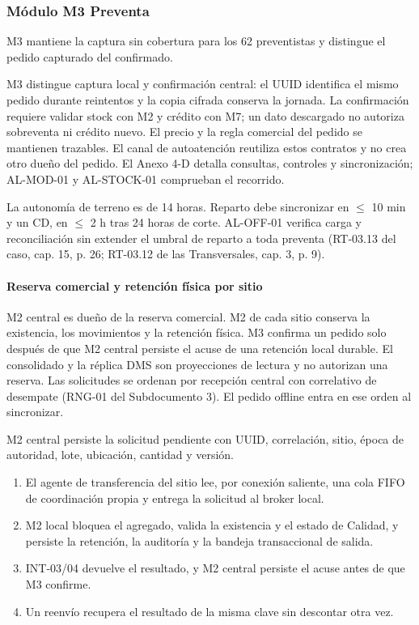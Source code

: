\subsubsection{Módulo M3 Preventa}
\label{subsec:modulo-m3}

M3 mantiene la captura sin cobertura para los 62 preventistas y distingue el pedido capturado del confirmado.

M3 distingue captura local y confirmación central: el UUID identifica el mismo pedido durante reintentos y la copia cifrada conserva la jornada. La confirmación requiere validar stock con M2 y crédito con M7; un dato descargado no autoriza sobreventa ni crédito nuevo. El precio y la regla comercial del pedido se mantienen trazables. El canal de autoatención reutiliza estos contratos y no crea otro dueño del pedido. El Anexo 4-D detalla consultas, controles y sincronización; AL-MOD-01 y AL-STOCK-01 comprueban el recorrido.

La autonomía de terreno es de 14 horas. Reparto debe sincronizar en $\leq$ 10 min y un CD, en $\leq$ 2 h tras 24 horas de corte. AL-OFF-01 verifica carga y reconciliación sin extender el umbral de reparto a toda preventa (RT-03.13 del caso, cap. 15, p. 26; RT-03.12 de las Transversales, cap. 3, p. 9).

\paragraph{Reserva comercial y retención física por sitio}

M2 central es dueño de la reserva comercial. M2 de cada sitio conserva la existencia, los movimientos y la retención física. M3 confirma un pedido solo después de que M2 central persiste el acuse de una retención local durable. El consolidado y la réplica DMS son proyecciones de lectura y no autorizan una reserva. Las solicitudes se ordenan por recepción central con correlativo de desempate (RNG-01 del Subdocumento 3). El pedido offline entra en ese orden al sincronizar.

M2 central persiste la solicitud pendiente con UUID, correlación, sitio, época de autoridad, lote, ubicación, cantidad y versión.

\begin{enumerate}
  \item El agente de transferencia del sitio lee, por conexión saliente, una cola FIFO de coordinación propia y entrega la solicitud al broker local.
  \item M2 local bloquea el agregado, valida la existencia y el estado de Calidad, y persiste la retención, la auditoría y la bandeja transaccional de salida.
  \item INT-03/04 devuelve el resultado, y M2 central persiste el acuse antes de que M3 confirme.
  \item Un reenvío recupera el resultado de la misma clave sin descontar otra vez.
\end{enumerate}

